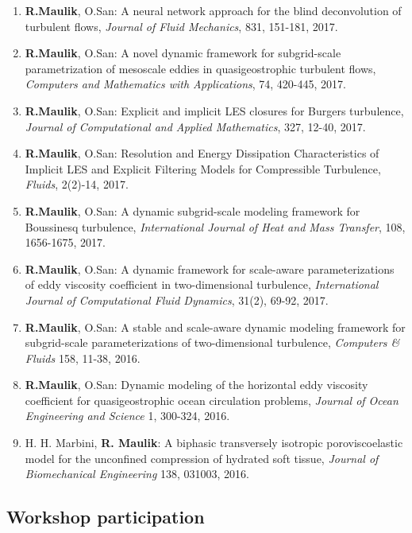 \documentclass[letterpaper]{article}
\begin{document}
\begin{enumerate}
\item \textbf{R.Maulik}, O.San: A neural network approach for the blind deconvolution of turbulent flows, {\it Journal of Fluid Mechanics}, 831, 151-181, 2017.

\item \textbf{R.Maulik}, O.San: A novel dynamic framework for subgrid-scale parametrization of mesoscale eddies in quasigeostrophic turbulent flows, {\it Computers and Mathematics with Applications}, 74, 420-445, 2017.

\item \textbf{R.Maulik}, O.San: Explicit and implicit LES closures for Burgers turbulence, {\it Journal of Computational and Applied Mathematics}, 327, 12-40, 2017.

\item \textbf{R.Maulik}, O.San: Resolution and Energy Dissipation Characteristics of Implicit LES and Explicit Filtering Models for Compressible Turbulence, {\it Fluids}, 2(2)-14, 2017.

\item \textbf{R.Maulik}, O.San: A dynamic subgrid-scale modeling framework for Boussinesq turbulence, {\it International Journal of Heat and Mass Transfer}, 108, 1656-1675, 2017.

\item \textbf{R.Maulik}, O.San: A dynamic framework for scale-aware parameterizations of eddy viscosity coefficient in two-dimensional turbulence, {\it International Journal of Computational Fluid Dynamics}, 31(2), 69-92, 2017.

\item \textbf{R.Maulik}, O.San: A stable and scale-aware dynamic modeling framework for subgrid-scale parameterizations of two-dimensional turbulence, {\it Computers \& Fluids} 158, 11-38, 2016.

\item \textbf{R.Maulik}, O.San: Dynamic modeling of the horizontal eddy viscosity coefficient for quasigeostrophic ocean circulation problems, {\it Journal of Ocean Engineering and Science} 1, 300-324, 2016.

\item H. H. Marbini, \textbf{R. Maulik}: A biphasic transversely isotropic poroviscoelastic model for the unconfined compression of hydrated soft tissue, {\it Journal of Biomechanical Engineering} 138, 031003, 2016.

\end{enumerate}

\subsection*{Workshop participation}
\end{document}
